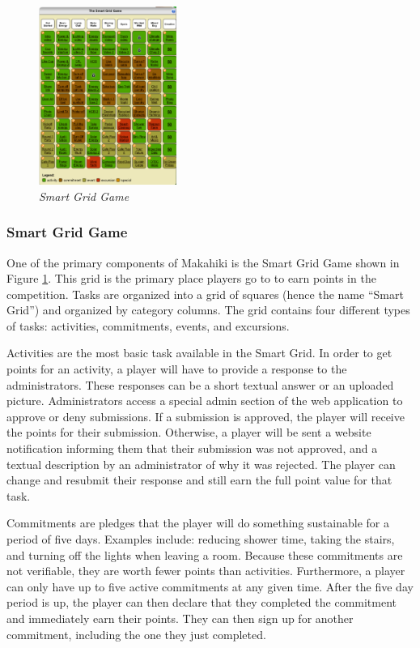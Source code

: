 \documentclass{acm_proc_article-sp}
\begin{document}
\begin{figure}[ht!]
  \center
  \includegraphics[width=0.4\textwidth]{smart-grid.eps}
  \caption{\em \small Smart Grid Game}
  \label{fig:SmartGrid}
\end{figure}

\subsubsection{Smart Grid Game}

One of the primary components of Makahiki is the Smart Grid Game shown in Figure \ref{fig:SmartGrid}. This grid is the primary place players go to to earn points in the competition. Tasks are organized into a grid of squares (hence the name ``Smart Grid'') and organized by category columns. The grid contains four different types of tasks: activities, commitments, events, and excursions.

Activities are the most basic task available in the Smart Grid. In order to get points for an activity, a player will have to provide a response to the administrators. These responses can be a short textual answer or an uploaded picture. Administrators access a special admin section of the web application to approve or deny submissions. If a submission is approved, the player will receive the points for their submission. Otherwise, a player will be sent a website notification informing them that their submission was not approved, and a textual description by an administrator of why it was rejected. The player can change and resubmit their response and still earn the full point value for that task.

Commitments are pledges that the player will do something sustainable for a period of five days. Examples include: reducing shower time, taking the stairs, and turning off the lights when leaving a room. Because these commitments are not verifiable, they are worth fewer points than activities. Furthermore, a player can only have up to five active commitments at any given time. After the five day period is up, the player can then declare that they completed the commitment and immediately earn their points. They can then sign up for another commitment, including the one they just completed.
\end{document}
